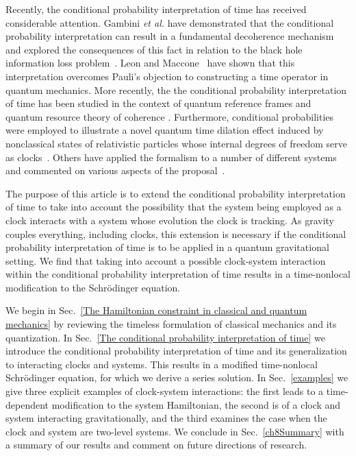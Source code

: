 \documentclass[a4paper,twocolumn,superscriptaddress,11pt,accepted=2019-06-04]{quantumarticle}
\begin{document}
Recently, the conditional probability interpretation of time has received considerable attention. Gambini  {\emph{et al.} \cite{Gambini:2004b,Gambini:2004, Gambini:2009}} have demonstrated that the conditional probability interpretation can result in a fundamental decoherence mechanism
and explored the consequences of this fact in relation to the black hole information loss problem~\cite{Gambini:2004a}. Leon and Maccone~\cite{Leon:2017} have shown that this interpretation overcomes Pauli's objection to constructing a time operator in quantum mechanics. More recently, the the conditional probability interpretation of time has been studied in the context of  quantum reference frames and quantum resource theory of coherence \cite{Martinelli:2019, Mendes:2018}. Furthermore, conditional probabilities were employed to illustrate a novel
quantum time dilation effect induced by nonclassical states of relativistic particles whose internal degrees of freedom serve as clocks~\cite{Smith:2019}. Others have applied the formalism to a number of different systems and commented on various aspects of the proposal~\mbox{\cite{Corbin:2009, Ekaterina-Moreva:2014, Marletto:2016, Boette:2016, Bryan:2017}}.


The purpose of this article is to extend the conditional probability interpretation of time to take into account the possibility that the system being employed as a clock interacts with a system whose evolution the clock is tracking. As gravity couples everything, including clocks, this extension is necessary if the conditional probability interpretation of time is to be applied in a quantum gravitational setting. We find that taking into account a possible clock-system interaction within the conditional probability interpretation of time results in a time-nonlocal modification to the Schr\"{o}dinger equation.



We begin in Sec.~\ref{The Hamiltonian constraint in classical and quantum mechanics} by reviewing the timeless formulation of classical mechanics \cite{Rovelli:2004, Kiefer:2012} and its quantization. In Sec.~\ref{The conditional probability interpretation of time} we introduce the conditional probability interpretation of time and its generalization to interacting clocks and systems. This results in a modified time-nonlocal Schr\"{o}dinger equation, for which we derive a series solution. {In Sec.~\ref{examples} we give three explicit examples of clock-system interactions: the first leads to a time-dependent modification to the system Hamiltonian, the second is of a clock and system interacting gravitationally, and the third examines the case when the clock and system are two-level systems.} We conclude in Sec.~\ref{ch8Summary} with a summary of our results and comment on future directions of research.
\end{document}

